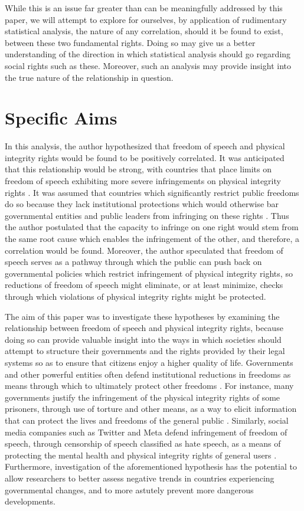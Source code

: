 \documentclass{article}
\begin{document}
While this is an issue far greater than can be meaningfully addressed by this paper, we will attempt to explore for ourselves, by application of rudimentary statistical analysis, the nature of any correlation, should it be found to exist, between these two fundamental rights. Doing so may give us a better understanding of the direction in which statistical analysis should go regarding social rights such as these. Moreover, such an analysis may provide insight into the true nature of the relationship in question. 

\section{Specific Aims}
In this analysis, the author hypothesized that freedom of speech and physical integrity rights would be found to be positively correlated. It was anticipated that this relationship would be strong, with countries that place limits on freedom of speech exhibiting more severe infringements on physical integrity rights \cite{Bell}. It was assumed that countries which significantly restrict public freedoms do so because they lack institutional protections which would otherwise bar governmental entities and public leaders from infringing on these rights \cite{Kearns}. Thus the author postulated that the capacity to infringe on one right would stem from the same root cause which enables the infringement of the other, and therefore, a correlation would be found. Moreover, the author speculated that freedom of speech serves as a pathway through which the public can push back on governmental policies which restrict infringement of physical integrity rights, so reductions of freedom of speech might eliminate, or at least minimize, checks through which violations of physical integrity rights might be protected. 

The aim of this paper was to investigate these hypotheses by examining the relationship between freedom of speech and physical integrity rights, because doing so can provide valuable insight into the ways in which societies should attempt to structure their governments and the rights provided by their legal systems so as to ensure that citizens enjoy a higher quality of life. Governments and other powerful entities often defend institutional reductions in freedoms as means through which to ultimately protect other freedoms \cite{Bell}. For instance, many governments justify the infringement of the physical integrity rights of some prisoners, through use of torture and other means, as a way to elicit information that can protect the lives and freedoms of the general public \cite{USSenateReport}. Similarly, social media companies such as Twitter and Meta defend infringement of freedom of speech, through censorship of speech classified as hate speech, as a means of protecting the mental health and physical integrity rights of general users \cite{Hooker}. Furthermore, investigation of the aforementioned hypothesis has the potential to allow researchers to better assess negative trends in countries experiencing governmental changes, and to more astutely prevent more dangerous developments.
\end{document}
